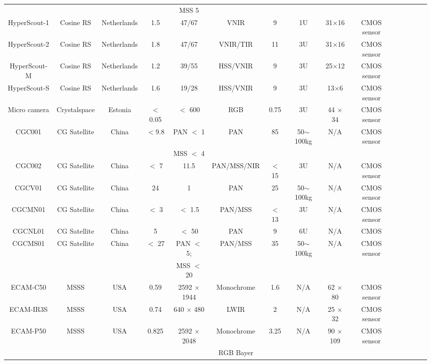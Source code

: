 \documentclass[final,5p,times,sort&compress,twocolumn]{elsarticle}
\begin{document}
\begin{table}
{\begin{tabular}{c c c c c c c c c c c c c c c}
			& & & & MSS 5 & &  & & & & & & & \\
			HyperScout-1 & Cosine RS & Netherlands & 1.5 & 47/67 &VNIR & 9  &  1U & 31$\times$16 & CMOS sensor & \cite{cosine2023}\\ 
			HyperScout-2 & Cosine RS & Netherlands & 1.8 & 47/67 & VNIR/TIR & 11 & 3U & 31$\times$16 & CMOS sensor  & \cite{cosine2023}\\ 
			HyperScout-M & Cosine RS & Netherlands & 1.2 & 39/55 & HSS/VNIR & 9 &  3U & 25$\times$12 & CMOS sensor  & \cite{cosine2023}\\ 
			HyperScout-S & Cosine RS & Netherlands & 1.6 & 19/28 &  HSS/VNIR & 9 &   3U & 13$\times$6 & CMOS sensor & \cite{cosine2023}\\ 
			Micro camera & Crystalspace & Estonia & $<$ 0.05 & $<$ 600 &  RGB & 0.75 & 3U & 44 $\times$ 34 & CMOS sensor  & \cite{slavinskis2015estcube}\\ 
			CGC001 & CG Satellite & China & $<$9.8 & PAN $<$ 1  & PAN & 85 &  50$\sim$100kg & N/A & CMOS sensor & \cite{cgsat2023} \\
			& & & & MSS $<$ 4 & &  & & & & & & & \\
			CGC002 & CG Satellite & China & $<$ 7 & 11.5 &  PAN/MSS/NIR & $<$ 15 &  3U & N/A & CMOS sensor  & \cite{cgsat2023}\\
			CGCV01 & CG Satellite & China &  24 & 1 & PAN & 25 &  50$\sim$100kg & N/A & CMOS sensor & \cite{cgsat2023} \\
			CGCMN01 & CG Satellite & China & $<$ 3 & $<$ 1.5 &  PAN/MSS & $<$ 13 & 3U & N/A & CMOS sensor & \cite{cgsat2023} \\
			CGCNL01 & CG Satellite & China & 5 & $<$ 50 & PAN & 9 & 6U & N/A & CMOS & \cite{cgsat2023} \\
			CGCMS01 & CG Satellite & China & $<$ 27 & PAN $<$ 5; &  PAN/MSS & 35 &  50$\sim$100kg & N/A & CMOS sensor & \cite{cgsat2023}\\
			& & & & MSS $<$ 20 & &  & & & & & & &  \\    
			ECAM-C50 & MSSS & USA & 0.59 & 2592 $\times$ 1944 & Monochrome & 1.6 &  N/A & 62 $\times$ 80 & CMOS  sensor & \cite{malin2023}\\
			ECAM-IR3S & MSSS & USA & 0.74 & 640 $\times$ 480 & LWIR & 2 &  N/A & 25 $\times$ 32 & CMOS sensor & \cite{malin2023}\\
			ECAM-P50 & MSSS & USA & 0.825 & 2592 $\times$ 2048 &  Monochrome & 3.25 & N/A & 90 $\times$ 109 & CMOS sensor  & \cite{malin2023}\\
			& & & & &   RGB Bayer & & & & & & & &\\

\end{tabular}}
\end{table}
\end{document}
